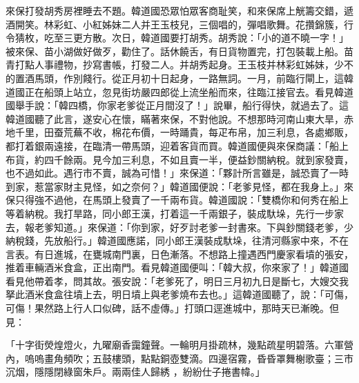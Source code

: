 \begin{showcontents}{}
來保打發胡秀房裡睡去不題。韓道國恐眾怕眾客商耻笑，和來保席上觥籌交錯，遞酒開笑。林彩虹、小紅姊妹二人并王玉枝兒，三個唱的，彈唱歌舞。花攢錦簇，行令猜枚，吃至三更方散。次日，韓道國要打胡秀。胡秀說：「小的道不曉一字！」被來保、苗小湖做好做歹，勸住了。話休饒舌，有日貨物置完，打包裝載上船。苗青打點人事禮物，抄寫書帳，打發二人。并胡秀起身。王玉枝并林彩虹姊妹，少不的置酒馬頭，作別餞行。從正月初十日起身，一路無詞。一月，前臨行閘上，這韓道國正在船頭上站立，忽見街坊嚴四郎從上流坐船而來，往臨江接官去。看見韓道國舉手說：「韓四橋，你家老爹從正月間沒了！」說畢，船行得快，就過去了。這韓道國聽了此言，遂安心在懷，瞞著來保，不對他說。不想那時河南山東大旱，赤地千里，田蚕荒蕪不收，棉花布價，一時踊貴，每疋布帛，加三利息，各處鄉販，都打着銀兩遠接，在臨清一帶馬頭，迎着客貨而買。韓道國便與來保商議：「船上布貨，約四千餘兩。見今加三利息，不如且賣一半，便益鈔關納稅。就到家發賣，也不過如此。遇行市不賣，誠為可惜！」來保道：「夥計所言雖是，誠恐賣了一時到家，惹當家財主見怪，如之奈何？」韓道國便說：「老爹見怪，都在我身上。」來保只得強不過他，在馬頭上發賣了一千兩布貨。韓道國說：「雙橋你和何秀在船上等着納稅。我打旱路，同小郎王漢，打着這一千兩銀子，裝成馱垛，先行一步家去，報老爹知道。」來保道：「你到家，好歹討老爹一封書來。下與鈔關錢老爹，少納稅錢，先放船行。」韓道國應諾，同小郎王漢裝成馱垛，往清河縣家中來，不在言表。有日進城，在甕城南門裏，日色漸落。不想路上撞遇西門慶家看墳的張安，推着車輛酒米食盒，正出南門。看見韓道國便叫：「韓大叔，你來家了！」韓道國看見他帶着孝，問其故。張安說：「老爹死了，明日三月初九日是斷七，大嫂交我拏此酒米食盒往墳上去，明日墳上與老爹燒布去也。」這韓道國聽了，說：「可傷，可傷！果然路上行人口似碑，話不虛傳。」打頭口逕進城中，那時天已漸晚。但見：

「十字街熒煌燈火，九曜廟香靄鐘聲。一輪明月掛疏林，幾點疏星明碧落。六軍營內，嗚嗚畫角頻吹；五鼓樓頭，點點銅壺雙滴。四邊宿霧，昏昏罩舞榭歌臺；三市沉烟，隱隱閉綠窗朱戶。兩兩佳人歸綉 ，紛紛仕子捲書幃。」


\end{showcontents}
